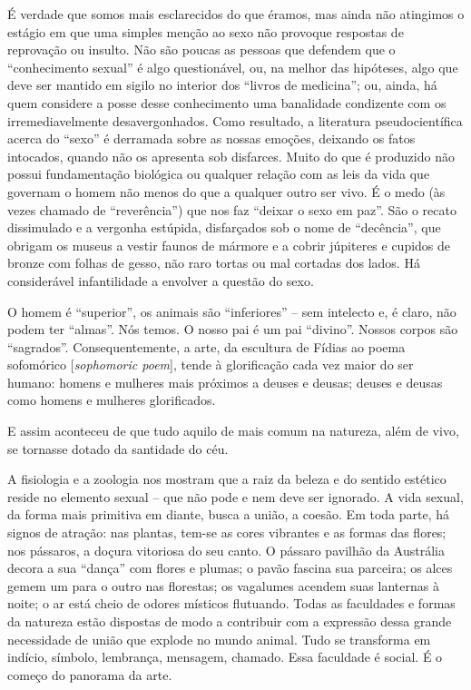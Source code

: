 É verdade que somos mais esclarecidos do que éramos, mas ainda não
atingimos o estágio em que uma simples menção ao sexo não provoque
respostas de reprovação ou insulto. Não são poucas as pessoas que
defendem que o ``conhecimento sexual'' é algo questionável, ou, na
melhor das hipóteses, algo que deve ser mantido em sigilo no interior
dos ``livros de medicina''; ou, ainda, há quem considere a posse desse
conhecimento uma banalidade condizente com os irremediavelmente
desavergonhados. Como resultado, a literatura pseudocientífica acerca do
``sexo'' é derramada sobre as nossas emoções, deixando os fatos
intocados, quando não os apresenta sob disfarces. Muito do que é
produzido não possui fundamentação biológica ou qualquer relação com as
leis da vida que governam o homem não menos do que a qualquer outro ser
vivo. É o medo (às vezes chamado de ``reverência'') que nos faz ``deixar
o sexo em paz''. São o recato dissimulado e a vergonha estúpida,
disfarçados sob o nome de ``decência'', que obrigam os museus a vestir
faunos de mármore e a cobrir júpiteres e cupidos de bronze com folhas de
gesso, não raro tortas ou mal cortadas dos lados. Há considerável
infantilidade a envolver a questão do sexo.

O homem é ``superior'', os animais são ``inferiores'' -- sem intelecto
e, é claro, não podem ter ``almas''. Nós temos. O nosso pai é um pai
``divino''. Nossos corpos são ``sagrados''. Consequentemente, a arte, da
escultura de Fídias ao poema sofomórico {[}\emph{sophomoric poem}{]},
tende à glorificação cada vez maior do ser humano: homens e mulheres
mais próximos a deuses e deusas; deuses e deusas como homens e mulheres
glorificados.

E assim aconteceu de que tudo aquilo de mais comum na natureza, além de
vivo, se tornasse dotado da santidade do céu.

\asterisc

A fisiologia e a zoologia nos mostram que a raiz da beleza e do sentido
estético reside no elemento sexual -- que não pode e nem deve ser
ignorado. A vida sexual, da forma mais primitiva em diante, busca a
união, a coesão. Em toda parte, há signos de atração: nas plantas,
tem-se as cores vibrantes e as formas das flores; nos pássaros, a doçura
vitoriosa do seu canto. O pássaro pavilhão da Austrália decora a sua
``dança'' com flores e plumas; o pavão fascina sua parceira; os alces
gemem um para o outro nas florestas; os vagalumes acendem suas lanternas
à noite; o ar está cheio de odores místicos flutuando. Todas as
faculdades e formas da natureza estão dispostas de modo a contribuir com
a expressão dessa grande necessidade de união que explode no mundo
animal. Tudo se transforma em indício, símbolo, lembrança, mensagem,
chamado. Essa faculdade é social. É o começo do panorama da arte.

